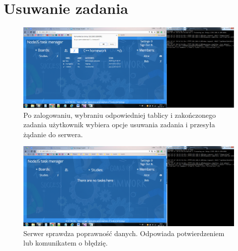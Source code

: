 \documentclass[12pt]{report}
\begin{document}
\section{Usuwanie zadania}
\begin{figure}[!hb]
\centering
\includegraphics[width=\textwidth,height=\textheight,keepaspectratio]{C1.png}
\captionsetup{labelformat=empty}
\caption[]{Po zalogowaniu, wybraniu odpowiedniej tablicy i zakończonego zadania użytkownik wybiera opcje usuwania zadania i przesyła żądanie do serwera.}
\end{figure}
\begin{figure}[!hb]
\centering
\includegraphics[width=\textwidth,height=\textheight,keepaspectratio]{C2.png}
\captionsetup{labelformat=empty}
\caption[]{Serwer sprawdza poprawność danych. Odpowiada potwierdzeniem lub komunikatem o błędzię.}
\end{figure}
\end{document}
